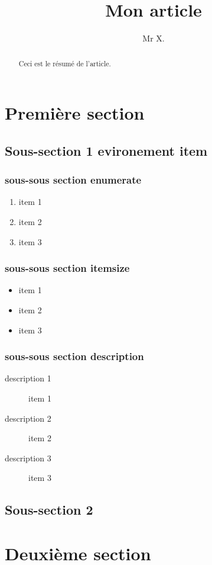 \documentclass{article}
\title{Mon article}
\author{Mr X.}
\begin{document}
\maketitle

\begin{abstract}
Ceci est le résumé de l'article.
\end{abstract}

\section{Première section}
\subsection{Sous-section 1 evironement item}

\subsubsection{sous-sous section enumerate}

\begin{enumerate}
    \item item 1
    \item item 2
    \item item 3
\end{enumerate}

\subsubsection{sous-sous section itemsize}

\begin{itemize}
\item item 1
\item item 2
\item item 3
\end{itemize}

\subsubsection{sous-sous section description}

\begin{description}
    \item[description 1] item 1
    \item[description 2] item 2
    \item[description 3] item 3  
\end{description}

\subsection{Sous-section 2}

\section{Deuxième section}
\end{document}
